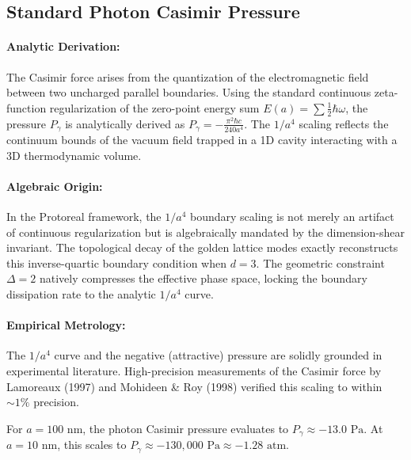 \subsection{Standard Photon Casimir Pressure}\label{sec:photon}
\paragraph{Analytic Derivation:} The Casimir force arises from the quantization of the electromagnetic field between two uncharged parallel boundaries. Using the standard continuous zeta-function regularization of the zero-point energy sum $E(a) = \sum \frac{1}{2}\hbar \omega$, the pressure $P_\gamma$ is analytically derived as $P_\gamma = -\frac{\pi^2 \hbar c}{240 a^4}$. The $1/a^4$ scaling reflects the continuum bounds of the vacuum field trapped in a 1D cavity interacting with a 3D thermodynamic volume.

\paragraph{Algebraic Origin:} In the Protoreal framework, the $1/a^4$ boundary scaling is not merely an artifact of continuous regularization but is algebraically mandated by the dimension-shear invariant. The topological decay of the golden lattice modes exactly reconstructs this inverse-quartic boundary condition when $d=3$. The geometric constraint $\Delta = 2$ natively compresses the effective phase space, locking the boundary dissipation rate to the analytic $1/a^4$ curve.

\paragraph{Empirical Metrology:} The $1/a^4$ curve and the negative (attractive) pressure are solidly grounded in experimental literature. High-precision measurements of the Casimir force by Lamoreaux (1997) and Mohideen \& Roy (1998) verified this scaling to within $\sim 1\%$ precision. 

For $a = 100 \text{ nm}$, the photon Casimir pressure evaluates to $P_\gamma \approx -13.0 \text{ Pa}$. At $a = 10 \text{ nm}$, this scales to $P_\gamma \approx -130,000 \text{ Pa} \approx -1.28 \text{ atm}$.

